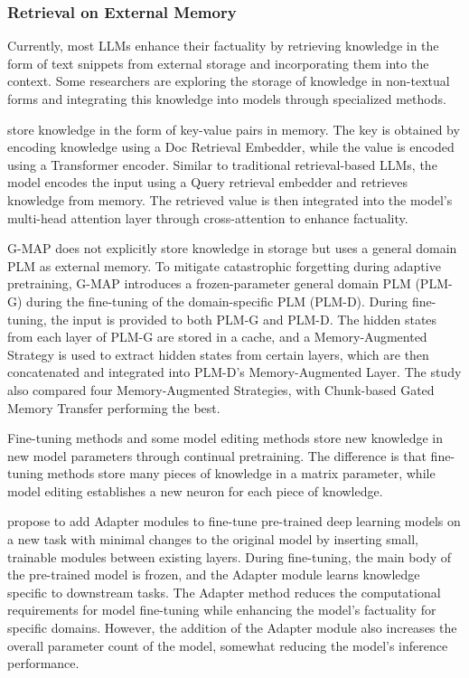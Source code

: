 

\subsubsection{Retrieval on External Memory}
\label{sec:enhace_rag_mem}

Currently, most LLMs enhance their factuality by retrieving knowledge in the form of text snippets from external storage and incorporating them into the context. Some researchers are exploring the storage of knowledge in non-textual forms and integrating this knowledge into models through specialized methods.

\citet{li2022decoupled} store knowledge in the form of key-value pairs in memory. The key is obtained by encoding knowledge using a Doc Retrieval Embedder, while the value is encoded using a Transformer encoder. Similar to traditional retrieval-based LLMs, the model encodes the input using a Query retrieval embedder and retrieves knowledge from memory. The retrieved value is then integrated into the model's multi-head attention layer through cross-attention to enhance factuality.

G-MAP \citep{wan2022gmap} does not explicitly store knowledge in storage but uses a general domain PLM as external memory. To mitigate catastrophic forgetting during adaptive pretraining, G-MAP introduces a frozen-parameter general domain PLM (PLM-G) during the fine-tuning of the domain-specific PLM (PLM-D). During fine-tuning, the input is provided to both PLM-G and PLM-D. The hidden states from each layer of PLM-G are stored in a cache, and a Memory-Augmented Strategy is used to extract hidden states from certain layers, which are then concatenated and integrated into PLM-D's Memory-Augmented Layer. The study also compared four Memory-Augmented Strategies, with Chunk-based Gated Memory Transfer performing the best.

Fine-tuning methods and some model editing methods store new knowledge in new model parameters through continual pretraining. The difference is that fine-tuning methods store many pieces of knowledge in a matrix parameter, while model editing establishes a new neuron for each piece of knowledge.

\citet{houlsby2019parameterefficient} propose to add Adapter modules to fine-tune pre-trained deep learning models on a new task with minimal changes to the original model by inserting small, trainable modules between existing layers. During fine-tuning, the main body of the pre-trained model is frozen, and the Adapter module learns knowledge specific to downstream tasks. The Adapter method reduces the computational requirements for model fine-tuning while enhancing the model's factuality for specific domains. However, the addition of the Adapter module also increases the overall parameter count of the model, somewhat reducing the model's inference performance.

